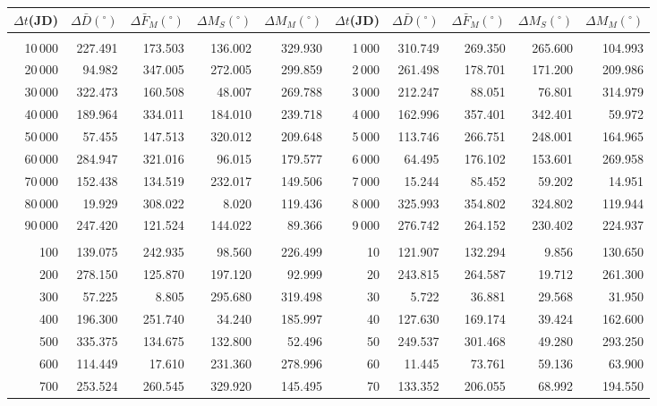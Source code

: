 \begin{table}[h!]
\centering
{\scriptsize
\begin{tabular}{rrrrr|rrrrr}
$\Delta t$(JD)& $\Delta \bar{D}(^\circ)$ &  $\Delta \bar{F}_M(^\circ)$ & $\Delta M_S(^\circ)$& $\Delta M_M (^\circ)$ & $\Delta t$(JD) & $\Delta \bar{D}(^\circ)$ & $\Delta \bar{F}_M(^\circ)$ 
&$\Delta M_S(^\circ)$ & $\Delta M_M(^\circ)$\\ \hline
&&&&&&&&&\\[-1.75ex]
10\,000 & 227.491 & 173.503 & 136.002 & 329.930 & 1\,000 & 310.749 & 269.350 & 265.600 & 104.993\\
20\,000 &  94.982 & 347.005 & 272.005 & 299.859 & 2\,000 & 261.498 & 178.701 & 171.200 & 209.986\\
30\,000 & 322.473 & 160.508 &  48.007 & 269.788 & 3\,000 & 212.247 &  88.051 &  76.801 & 314.979\\
40\,000 & 189.964 & 334.011 & 184.010 & 239.718 & 4\,000 & 162.996 & 357.401 & 342.401 &  59.972\\
50\,000 &  57.455 & 147.513 & 320.012 & 209.648 & 5\,000 & 113.746 & 266.751 & 248.001 & 164.965\\
60\,000 & 284.947 & 321.016 &  96.015 & 179.577 & 6\,000 &  64.495 & 176.102 & 153.601 & 269.958\\
70\,000 & 152.438 & 134.519 & 232.017 & 149.506 & 7\,000 &  15.244 &  85.452 &  59.202 &  14.951\\
80\,000 &  19.929 & 308.022 &   8.020 & 119.436 & 8\,000 & 325.993 & 354.802 & 324.802 & 119.944\\
90\,000 & 247.420 & 121.524 & 144.022 &  89.366 & 9\,000 & 276.742 & 264.152 & 230.402 & 224.937\\
&&&&&&&&&\\
100 & 139.075 & 242.935 &  98.560 & 226.499 & 10 & 121.907 & 132.294 &   9.856 & 130.650\\
200 & 278.150 & 125.870 & 197.120 &  92.999 & 20 & 243.815 & 264.587 &  19.712 & 261.300\\
300 &  57.225 &   8.805 & 295.680 & 319.498 & 30 &   5.722 &  36.881 &  29.568 &  31.950\\
400 & 196.300 & 251.740 &  34.240 & 185.997 & 40 & 127.630 & 169.174 &  39.424 & 162.600\\
500 & 335.375 & 134.675 & 132.800 &  52.496 & 50 & 249.537 & 301.468 &  49.280 & 293.250\\
600 & 114.449 &  17.610 & 231.360 & 278.996 & 60 &  11.445 &  73.761 &  59.136 &  63.900\\
700 & 253.524 & 260.545 & 329.920 & 145.495 & 70 & 133.352 & 206.055 &  68.992 & 194.550\\

\end{tabular}}
\end{table}
